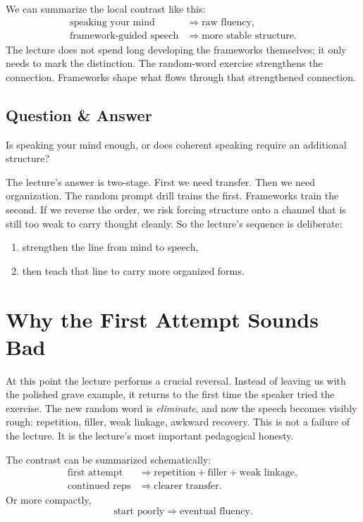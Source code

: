 We can summarize the local contrast like this:
\begin{align}
\text{speaking your mind} &\Longrightarrow \text{raw fluency},\\
\text{framework-guided speech} &\Longrightarrow \text{more stable structure}.
\end{align}
The lecture does not spend long developing the frameworks themselves; it only needs to mark the distinction. The random-word exercise strengthens the connection. Frameworks shape what flows through that strengthened connection.

\subsection{Question \& Answer}

Is speaking your mind enough, or does coherent speaking require an additional structure?

The lecture's answer is two-stage. First we need transfer. Then we need organization. The random prompt drill trains the first. Frameworks train the second. If we reverse the order, we risk forcing structure onto a channel that is still too weak to carry thought cleanly. So the lecture's sequence is deliberate:
\begin{enumerate}
\item strengthen the line from mind to speech,
\item then teach that line to carry more organized forms.
\end{enumerate}

\section{Why the First Attempt Sounds Bad}

At this point the lecture performs a crucial reversal. Instead of leaving us with the polished grave example, it returns to the first time the speaker tried the exercise. The new random word is \emph{eliminate}, and now the speech becomes visibly rough: repetition, filler, weak linkage, awkward recovery. This is not a failure of the lecture. It is the lecture's most important pedagogical honesty.

The contrast can be summarized schematically:
\begin{align}
\text{first attempt} &\Longrightarrow \text{repetition} + \text{filler} + \text{weak linkage},\\
\text{continued reps} &\Longrightarrow \text{clearer transfer}.
\end{align}
Or more compactly,
\begin{equation}
\text{start poorly} \Longrightarrow \text{eventual fluency}.
\end{equation}

